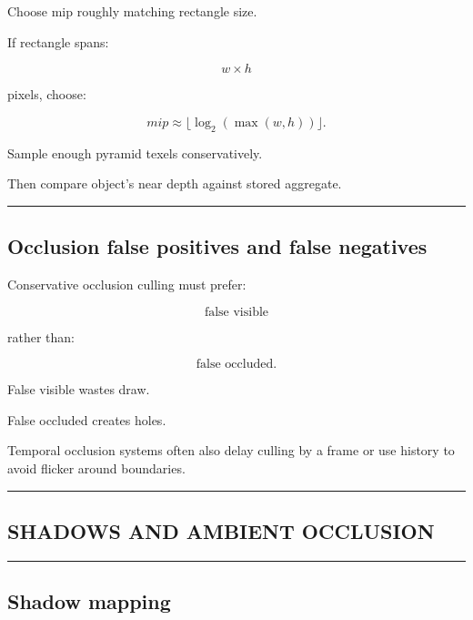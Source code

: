 Choose mip roughly matching rectangle size.

If rectangle spans:

\[
w\times h
\]

pixels, choose:

\[
mip\approx
\lfloor\log_2(\max(w,h))\rfloor.
\]

Sample enough pyramid texels conservatively.

Then compare object's near depth against stored aggregate.

\begin{center}\rule{0.5\linewidth}{0.5pt}\end{center}

\subsection{Occlusion false positives and false negatives}\label{04-visual-computing-ii-ch040-occlusion-false-positives-and-false-negatives}

\hypertarget{04-visual-computing-ii-ch040-occlusion-false-positives-and-false-negatives}{}

Conservative occlusion culling must prefer:

\[
\boxed{
\text{false visible}
}
\]

rather than:

\[
\boxed{
\text{false occluded}.
}
\]

False visible wastes draw.

False occluded creates holes.

Temporal occlusion systems often also delay culling by a frame or use history to avoid flicker around boundaries.

\begin{center}\rule{0.5\linewidth}{0.5pt}\end{center}

\subsection{SHADOWS AND AMBIENT OCCLUSION}\label{04-visual-computing-ii-ch040-shadows-and-ambient-occlusion}

\hypertarget{04-visual-computing-ii-ch040-shadows-and-ambient-occlusion}{}

\begin{center}\rule{0.5\linewidth}{0.5pt}\end{center}

\subsection{Shadow mapping}\label{04-visual-computing-ii-ch040-shadow-mapping}

